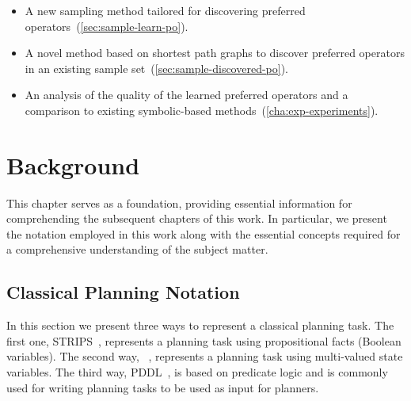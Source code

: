 \documentclass[ppgc,diss,english]{iiufrgs}
\begin{document}
\begin{itemize}
\item A new sampling method tailored for discovering preferred operators~(\cref{sec:sample-learn-po}).
\item A novel method based on shortest path graphs to discover preferred operators in an existing sample set~(\cref{sec:sample-discovered-po}).
\item An analysis of the quality of the learned preferred operators and a comparison to existing symbolic-based methods~(\cref{cha:exp-experiments}).
\end{itemize}
%
%
\chapter{Background}
\label{cha:background}
This chapter serves as a foundation, providing essential information for comprehending the subsequent chapters of this work. In particular, we present the notation employed in this work along with the essential concepts required for a comprehensive understanding of the subject matter.

\section{Classical Planning Notation}
\label{sec:background-planning-notation}
In this section we present three ways to represent a classical planning task. The first one, STRIPS~\cite{Fikes.Nilsson/1971}, represents a planning task using propositional facts (Boolean variables). The second way, \sas~\cite{Backstrom.Nebel/1995}, represents a planning task using multi-valued state variables. The third way, PDDL~\cite{Ghallab.etal/1998}, is based on predicate logic and is commonly used for writing planning tasks to be used as input for planners.
\end{document}
